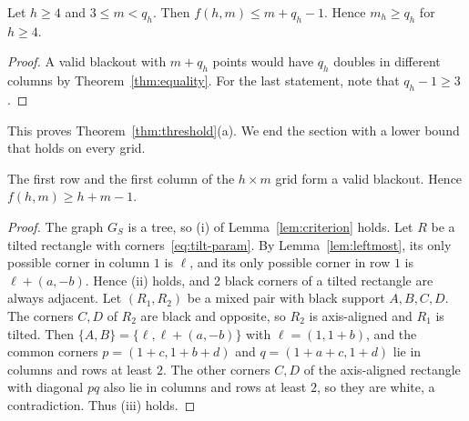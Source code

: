 \begin{corollary}\label{cor:small-m}
Let $h\ge4$ and $3\le m<q_h$. Then $f(h,m)\le m+q_h-1$. Hence $m_h\ge q_h$ for $h\ge4$.
\end{corollary}

\begin{proof}
A valid blackout with $m+q_h$ points would have $q_h$ doubles in different columns by
Theorem~\ref{thm:equality}. For the last statement, note that $q_h-1\ge3$.
\end{proof}

This proves Theorem~\ref{thm:threshold}(a). We end the section with a lower bound that
holds on every grid.

\begin{lemma}\label{lem:cross}
The first row and the first column of the $h\times m$ grid form a valid blackout. Hence
$f(h,m)\ge h+m-1$.
\end{lemma}

\begin{proof}
The graph $G_S$ is a tree, so (i) of Lemma~\ref{lem:criterion} holds. Let $R$ be a tilted
rectangle with corners~\eqref{eq:tilt-param}. By Lemma~\ref{lem:leftmost}, its only
possible corner in column $1$ is $\ell$, and its only possible corner in row $1$ is
$\ell+(a,-b)$. Hence (ii) holds, and 2 black corners of a tilted rectangle are always
adjacent. Let $(R_1,R_2)$ be a mixed pair with black support $A,B,C,D$. The corners $C,D$
of $R_2$ are black and opposite, so $R_2$ is axis-aligned and $R_1$ is tilted. Then
$\{A,B\}=\{\ell,\ell+(a,-b)\}$ with $\ell=(1,1+b)$, and the common corners
$p=(1+c,1+b+d)$ and $q=(1+a+c,1+d)$ lie in columns and rows at least $2$. The other
corners $C,D$ of the axis-aligned rectangle with diagonal $pq$ also lie in columns and rows
at least $2$, so they are white, a contradiction. Thus (iii) holds.
\end{proof}
